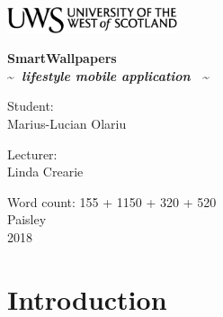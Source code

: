 \documentclass[version=last,fontsize=13pt]{scrartcl}
\begin{document}
\begin{titlepage}
	\begin{center}	
		\includegraphics[width = 5cm,height = 1.5cm]{./imgs/uws_logo.png}\\[5cm]
	
{ \huge \bfseries %
		SmartWallpapers\\ \Large
		\textasciitilde \textit{~lifestyle mobile application~} \textasciitilde\\ 
}
	\vspace{2cm}			
			
		\begin{flushright}
				\large Student:\\
				Marius-Lucian Olariu\\[1cm]
		\end{flushright}
		
	
		\begin{flushleft}
			 \large
				Lecturer: \\
				Linda Crearie \\[1cm]
		\end{flushleft}
		
	\vspace{2cm}	
	
		
		\vfill
		
		{\large {Word count: 155 + 1150 + 320  + 520\\ Paisley \\ 2018}}
		\end{center}
\end{titlepage}

\newpage

\tableofcontents

\newpage

\section{Introduction}
\end{document}
